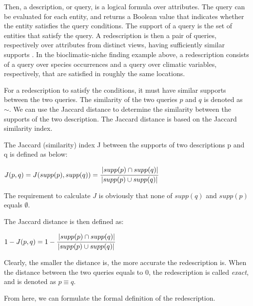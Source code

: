 Then, a description, or query, is a logical formula over attributes.
The query can be evaluated for each entity, and returns a Boolean value that indicates whether the entity satisfies the query conditions.
The support of a query is the set of entities that satisfy the query.
A redescription is then a pair of queries, respectively over attributes from distinct views, having sufficiently similar supports \cite{galbrun2018redescription}.
In the bioclimatic-niche finding example above, a redescription consists of a query over species occurrences and a query over climatic variables, respectively, that are satisfied in roughly the same locations.

For a redescription to satisfy the conditions, it must have similar supports between the two queries.
The similarity of the two queries $p$ and $q$ is denoted as $\sim$.
We can use the Jaccard distance to determine the similarity between the supports of the two description.
The Jaccard distance is based on the Jaccard similarity index.

\begin{definition}
    The Jaccard (similarity) index J between the supports of two descriptions p and q is defined as below:

    \begin{math}
        J(p, q) = J(supp(p), supp(q)) = \cfrac{\left|supp(p)\cap supp(q)\right|}{\left|supp(p)\cup supp(q)\right|}
    \end{math}
\end{definition}

The requirement to calculate $J$ is obviously that none of $supp(q)$ and $supp(p)$ equals $\emptyset$.

\begin{definition}
    The Jaccard distance is then defined as:

    \begin{math}
        1 - J(p, q) = 1 - \cfrac{\left|supp(p)\cap supp(q)\right|}{\left|supp(p)\cup supp(q)\right|}
    \end{math}
\end{definition}

Clearly, the smaller the distance is, the more accurate the redescription is.
When the distance between the two queries equals to $0$, the redescription is called \textit{exact}, and is denoted as $p \equiv q$.

From here, we can formulate the formal definition of the redescription.

